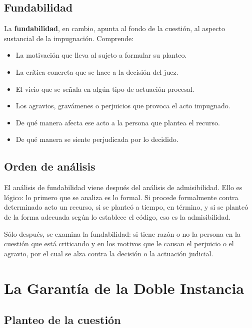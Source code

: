 \documentclass[12pt,oneside]{book}
\begin{document}
\section{Fundabilidad}

La \textbf{fundabilidad}, en cambio, apunta al fondo de la cuestión, al aspecto sustancial de la impugnación. Comprende:

\begin{itemize}
    \item La motivación que lleva al sujeto a formular su planteo.
    \item La crítica concreta que se hace a la decisión del juez.
    \item El vicio que se señala en algún tipo de actuación procesal.
    \item Los agravios, gravámenes o perjuicios que provoca el acto impugnado.
    \item De qué manera afecta ese acto a la persona que plantea el recurso.
    \item De qué manera se siente perjudicada por lo decidido.
\end{itemize}

\section{Orden de análisis}

El análisis de fundabilidad viene después del análisis de admisibilidad. Ello es lógico: lo primero que se analiza es lo formal. Si procede formalmente contra determinado acto un recurso, si se planteó a tiempo, en término, y si se planteó de la forma adecuada según lo establece el código, eso es la admisibilidad.

Sólo después, se examina la fundabilidad: si tiene razón o no la persona en la cuestión que está criticando y en los motivos que le causan el perjuicio o el agravio, por el cual se alza contra la decisión o la actuación judicial.


\chapter{La Garantía de la Doble Instancia}

\section{Planteo de la cuestión}
\end{document}
